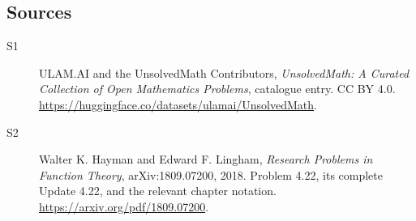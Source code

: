 \documentclass[11pt]{book}
\begin{document}
\subsection{Sources}
\begin{description}
\item[\hypertarget{source:statement:1}{S1}] ULAM.AI and the UnsolvedMath Contributors, \emph{UnsolvedMath: A Curated Collection of Open Mathematics Problems}, catalogue entry. CC BY 4.0. \url{https://huggingface.co/datasets/ulamai/UnsolvedMath}.
\item[\hypertarget{source:statement:2}{S2}] Walter K. Hayman and Edward F. Lingham, \emph{Research Problems in Function Theory}, arXiv:1809.07200, 2018. Problem 4.22, its complete Update 4.22, and the relevant chapter notation. \url{https://arxiv.org/pdf/1809.07200}.
\end{description}
\label{end:statement}
\end{document}
